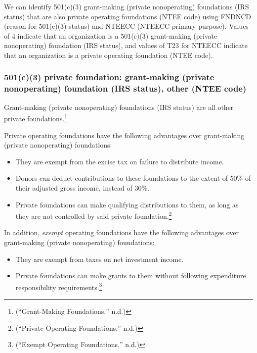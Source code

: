 \documentclass[
  letterpaper,
  DIV=11,
  numbers=noendperiod]{scrreprt}
\providecommand{\tightlist}{%
  \setlength{\itemsep}{0pt}\setlength{\parskip}{0pt}}\usepackage{longtable,booktabs,array}
\begin{document}
We can identify 501(c)(3) grant-making (private nonoperating)
foundations (IRS status) that are also private operating foundations
(NTEE code) using FNDNCD (reason for 501(c)(3) status) and NTEECC
(NTEECC primary purpose). Values of 4 indicate that an organization is a
501(c)(3) grant-making (private nonoperating) foundation (IRS status),
and values of T23 for NTEECC indicate that an organization is a private
operating foundation (NTEE code).

\hypertarget{c3-private-foundation-grant-making-private-nonoperating-foundation-irs-status-other-ntee-code}{%
\subsubsection{501(c)(3) private foundation: grant-making (private
nonoperating) foundation (IRS status), other (NTEE
code)}\label{c3-private-foundation-grant-making-private-nonoperating-foundation-irs-status-other-ntee-code}}

Grant-making (private nonoperating) foundations (IRS status) are all
other private foundations.\footnote{({``Grant-Making Foundations,''}
  n.d.)}

Private operating foundations have the following advantages over
grant-making (private nonoperating) foundations:

\begin{itemize}
\tightlist
\item
  They are exempt from the excise tax on failure to distribute income.
\item
  Donors can deduct contributions to these foundations to the extent of
  50\% of their adjusted gross income, instead of 30\%.
\item
  Private foundations can make qualifying distributions to them, as long
  as they are not controlled by said private foundation.\footnote{({``Private
    Operating Foundations,''} n.d.)}
\end{itemize}

In addition, \emph{exempt} operating foundations have the following
advantages over grant-making (private nonoperating) foundations:

\begin{itemize}
\tightlist
\item
  They are exempt from taxes on net investment income.
\item
  Private foundations can make grants to them without following
  expenditure responsibility requirements.\footnote{({``Exempt Operating
    Foundations,''} n.d.)}
\end{itemize}
\end{document}
